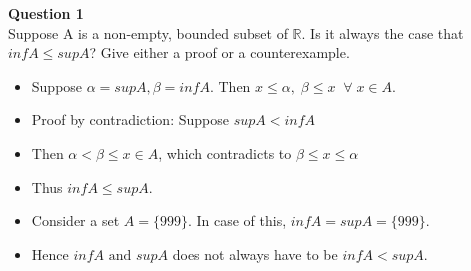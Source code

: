 \documentclass[12pt]{article}
\begin{document}
 



\textbf{Question 1}\\
Suppose A is a non-empty, bounded subset of $\mathbb{R}$. Is it always the case that $inf A \le sup A$? Give either a proof or a counterexample. \begin{itemize}
    \item Suppose $\alpha = supA, \beta = infA.$ Then $x \le \alpha,\;\beta \le x\;\;\forall\;x\in A$.
    \item Proof by contradiction: Suppose $supA < infA$
    \item Then $\alpha < \beta \le x \in A$, which contradicts to $\beta\le x \le \alpha$
    \item Thus $infA \le supA$.
    
    \item Consider a set $A = \{999\} $. In case of this, $infA = supA = \{999\}.$
    \item Hence $infA\text{ and }supA$ does not always have to be $infA < supA.$
\end{itemize}
\end{document}
